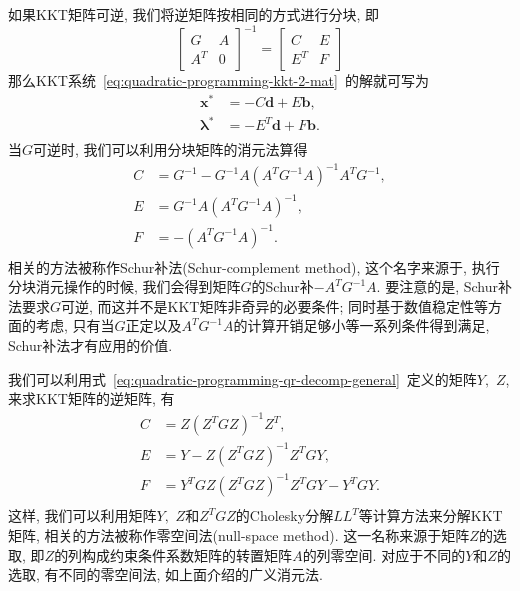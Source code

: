 \documentclass{SBCbookchapter}
\newcommand{\V}[1]{{\bm{#1}}}
\numberwithin{equation}{section}
\begin{document}
如果KKT矩阵可逆, 我们将逆矩阵按相同的方式进行分块, 即
\begin{equation}
\label{eq:quadratic-programming-kkt-inverse}
\begin{bmatrix} G & A \\ A^T & 0 \end{bmatrix}^{-1} = \begin{bmatrix} C & E \\ E^T & F \end{bmatrix}
\end{equation}
那么KKT系统~\eqref{eq:quadratic-programming-kkt-2-mat}~的解就可写为
\begin{equation}
\label{eq:quadratic-programming-kkt-sol-1}
\begin{aligned}
\V{x}^* & = - C \V{d} + E \V{b}, \\
\V{\lambda}^* & = - E^T \V{d} + F \V{b}. \\
\end{aligned}
\end{equation}
当$G$可逆时, 我们可以利用分块矩阵的消元法算得
\begin{equation}
\label{eq:quadratic-programming-kkt-inv-1}
\begin{aligned}
C & = G^{-1} - G^{-1} A \left( A^TG^{-1}A \right)^{-1} A^T G^{-1},\\
E & = G^{-1} A \left( A^TG^{-1}A \right)^{-1},\\
F & = - \left( A^TG^{-1}A \right)^{-1}.\\
\end{aligned}
\end{equation}
相关的方法被称作Schur补法(Schur-complement method), 这个名字来源于, 执行分块消元操作的时候, 我们会得到矩阵$G$的Schur补$-A^TG^{-1}A.$ 要注意的是, Schur补法要求$G$可逆, 而这并不是KKT矩阵非奇异的必要条件; 同时基于数值稳定性等方面的考虑, 只有当$G$正定以及$A^TG^{-1}A$的计算开销足够小等一系列条件得到满足, Schur补法才有应用的价值.

我们可以利用式~\eqref{eq:quadratic-programming-qr-decomp-general}~定义的矩阵$Y,$ $Z$, 来求KKT矩阵的逆矩阵, 有
\begin{equation}
\label{eq:quadratic-programming-kkt-inv-2}
\begin{aligned}
C & = Z \left( Z^T G Z \right)^{-1} Z^T,\\
E & = Y - Z \left( Z^T G Z \right)^{-1} Z^T G Y,\\
F & = Y^T G Z \left( Z^T G Z \right)^{-1} Z^T G Y - Y^T G Y.\\
\end{aligned}
\end{equation}
这样, 我们可以利用矩阵$Y,$ $Z$和$Z^T G Z$的Cholesky分解$L L^T$等计算方法来分解KKT矩阵, 相关的方法被称作零空间法(null-space method). 这一名称来源于矩阵$Z$的选取, 即$Z$的列构成约束条件系数矩阵的转置矩阵$A$的列零空间. 对应于不同的$Y$和$Z$的选取, 有不同的零空间法, 如上面介绍的广义消元法.
\end{document}
